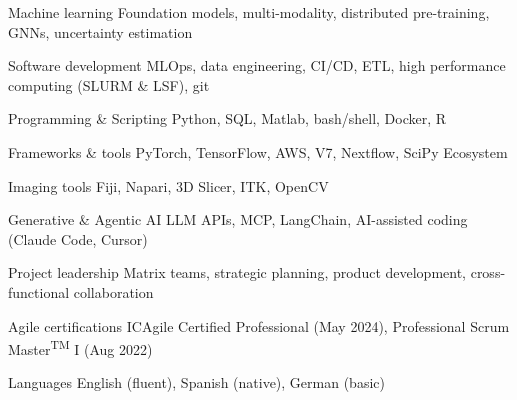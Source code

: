 


\begin{cvskills}

\cvskill
{Machine learning}
{Foundation models, multi-modality, distributed pre-training, GNNs, uncertainty estimation}

\cvskill
{Software development}
{MLOps, data engineering, CI/CD, ETL, high performance computing (SLURM \& LSF), git}

\cvskill
{Programming \& Scripting} %
{Python, SQL, Matlab, bash/shell, Docker, R} %

\cvskill
{Frameworks \& tools} %
{PyTorch, TensorFlow, AWS, V7, Nextflow, SciPy Ecosystem} %

\cvskill
{Imaging tools} %
{Fiji, Napari, 3D Slicer, ITK, OpenCV} %

\cvskill
{Generative \& Agentic AI}
{LLM APIs, MCP, LangChain, AI-assisted coding (Claude Code, Cursor)}

\cvskill
{Project leadership}
{Matrix teams, strategic planning, product development, cross-functional collaboration}

\cvskill
{Agile certifications}
{ICAgile Certified Professional (May 2024), Professional Scrum Master\textsuperscript{TM} I (Aug 2022)}

\cvskill
{Languages} %
{English (fluent), Spanish (native), German (basic)} %


\end{cvskills}